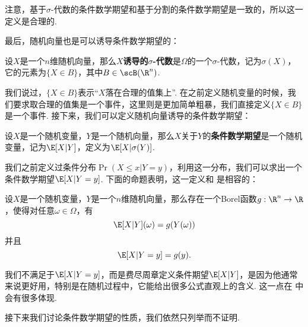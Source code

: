 注意，基于$\sigma$-代数的条件数学期望和基于分割的条件数学期望是一致的，所以这一定义是合理的. 

最后，随机向量也是可以诱导条件数学期望的：

\begin{definition}
设$X$是一个$n$维随机向量，那么\textbf{$X$诱导的$\sigma$-代数}是$\Omega$的一个$\sigma$-代数，记为$\sigma(X)$，它的元素为$\{X\in B\}$，其中$B\in\scB(\R^n)$.
\end{definition}

我们说过，$\{X\in B\}$表示“$X$落在合理的值集上”. 在之前定义随机变量的时候，我们要求取合理的值集是一个事件，这里则是更加简单粗暴，我们直接定义$\{X\in B\}$是一个事件. 接下来，我们可以定义随机向量诱导的条件数学期望：

\begin{definition}[随机向量诱导的条件数学期望]\label{def:conditional-expectation-vector}
设$X$是一个随机变量，$Y$是一个随机向量，那么$X$关于$Y$的\textbf{条件数学期望}是一个随机变量，记为$\E[X|Y]$，定义为$\E[X|\sigma(Y)]$.
\end{definition}

我们之前定义过条件分布$\Pr(X\leq x|Y=y)$，利用这一分布，我们可以求出一个条件数学期望$\E[X|Y=y]$. 下面的命题表明，这一定义和 是相容的：

\begin{proposition}\label{prop:conditional-expectation-vector}
    设$X$是一个随机变量，$Y$是一个$n$维随机向量，那么存在一个Borel函数$g:\R^n\to\R$，使得对任意$\omega\in\Omega$，有
    \[\E[X|Y](\omega)=g(Y(\omega))\]
    并且
    \[\E[X|Y=y]=g(y).\]
\end{proposition}

我们不满足于$\E[X|Y=y]$，而是费尽周章定义条件期望$\E[X|Y]$，是因为他通常来说更好用，特别是在随机过程中，它能给出很多公式直观上的含义. 这一点在 中会有很多体现. 

接下来我们讨论条件数学期望的性质，我们依然只列举而不证明. 

